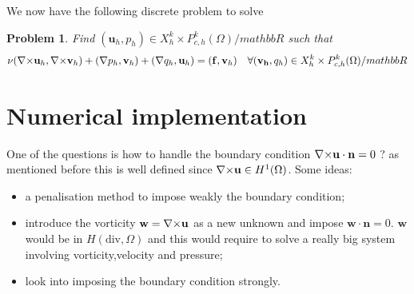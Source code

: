 \documentclass{article}
\newtheorem{problem}{Problem}
\newcommand{\Hdiv}{\ensuremath{H(\mathrm{div},\Omega)}\xspace}
\newcommand{\Pkch}{\ensuremath{P^k_{c,h}(\Omega)}\xspace}
\newcommand{\Hp}[1][1]{\ensuremath{H^{#1}(\Omega)}\xspace}
\begin{document}

We now have the following discrete problem to solve
\begin{problem}
  \label{prob:3}
  Find $(\mathbf{u}_h,p_h) \in X^k_{h} \times \Pkch/mathbb{R}$ such that
  \begin{equation}
    \label{eq:18}
    \nu (\curl \mathbf{u}_h, \curl \mathbf{v}_h ) + (\nabla p_h, \mathbf{v}_h) + (\nabla
    q_h, \mathbf{u}_h ) = (\mathbf{f}, \mathbf{v}_h)\quad \forall
    (\mathbf{v_h},q_h) \in X^k_{h} \times \Pkch/mathbb{R}
  \end{equation}
\end{problem}


\section{Numerical implementation}

One of the questions is how to handle the boundary condition ${\nabla\times} \mathbf{u}
\cdot \mathbf{n} = 0$ ? as mentioned before this is well defined since $\curl
\mathbf{u} \in \Hp$.
Some ideas:
\begin{itemize}
\item a penalisation method to impose weakly the boundary condition;
\item introduce the vorticity $\mathbf{w} = {\nabla\times} \mathbf{u}$ as a new unknown
  and impose $\mathbf{w}\cdot \mathbf{n} = 0$. $\mathbf{w}$ would be in $\Hdiv$
  and this would require to solve a really big system involving
  vorticity,velocity and pressure;
\item look into imposing the boundary condition strongly.
\end{itemize}




\end{document}
